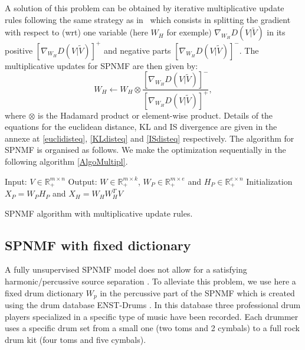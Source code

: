 \documentclass[journal]{IEEEtran}
\begin{document}
A solution of this problem can be obtained by iterative multiplicative update rules following the same strategy as in~\cite{yuanOja2005,Lee01algorithmsfor} which consists in splitting the gradient with respect to (wrt) one variable (here $W_H$ for exemple) $\nabla_{W_H} D(V|\tilde{V})$ in its positive $[\nabla_{W_H} D(V|\tilde{V})]^{+}$ and negative parts $[\nabla_{W_H} D(V|\tilde{V})]^{-}$.
The multiplicative updates for SPNMF are then given by: 
$$W_{H} \leftarrow W_{H} \otimes \frac{ [\nabla_{W_H} D(V|\tilde{V})]^{-} }{[\nabla_{W_H} D(V|\tilde{V})]^{+}}, $$
where $\otimes$ is the Hadamard product or element-wise product. Details of the equations for the euclidean distance, KL and IS divergence are given in the annexe at \ref{euclidisteq}, \ref{KLdisteq} and \ref{ISdisteq} respectively. 
The algorithm for SPNMF is organised as follows. We make the optimization sequentially in the following algorithm \ref{AlgoMultipl}.

\begin{algorithm}[h]
 Input: $V \in \mathbb{R}_{+}^{m \times n} $
 Output: $W \in \mathbb{R}_{+}^{m \times k}$, $W_P \in \mathbb{R}_+^{m \times e}$ and $H_P \in \mathbb{R}_{+}^{e \times n}$
 Initialization\;
 $ X_P = W_PH_P $ and
 $ X_H = W_HW_H^TV $ 
  
 \vspace{0.2cm}
 \caption{SPNMF algorithm with multiplicative update rules.}\label{AlgoMultipl}
\end{algorithm}


\subsection{SPNMF with fixed dictionary}\label{fixedict}  

A fully unsupervised SPNMF model does not allow for a satisfying harmonic/percussive source separation \cite{laroche2015structured}. To alleviate this problem, we use here a fixed drum dictionary $W_p$ in the percussive part of the SPNMF which is created using the drum database ENST-Drums \cite{gillet2006enst}. In this database three professional drum players specialized in a specific type of music have been recorded. Each drummer uses a specific drum set from a small one (two toms and 2 cymbals) to a full rock drum kit (four toms and five cymbals). 
\end{document}
